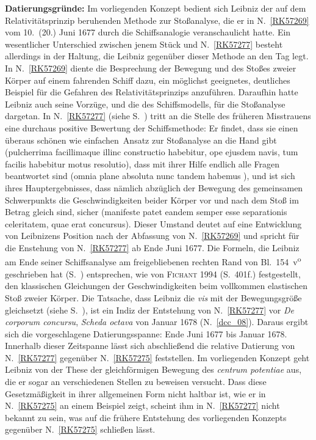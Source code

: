 \begin{ledgroup}
\footnotesize
\pstart
\noindent%
\textbf{Datierungsgründe:} %
Im vorliegenden Konzept bedient sich Leibniz der auf dem Relativitätsprinzip beruhenden Methode zur Stoßanalyse,
%
die er in N.~\ref{RK57269} vom 10.\ (20.) Juni 1677 durch die Schiffsanalogie veranschaulicht hatte.
%
Ein wesentlicher Unterschied zwischen jenem Stück und N.~\ref{RK57277} besteht allerdings in der Haltung,
%
die Leibniz gegenüber dieser Methode an den Tag legt.
%
In N.~\ref{RK57269} diente die Besprechung der Bewegung und des Stoßes zweier Körper auf einem fahrenden Schiff dazu,
%
ein möglichst geeignetes, deutliches Beispiel für die Gefahren des Relativitätsprinzips anzuführen.
%
Daraufhin hatte Leibniz auch seine Vorzüge, und die des Schiffsmodells, für die Stoßanalyse dargetan.
%
In N.~\ref{RK57277} (siehe S.~) 
%
tritt an die Stelle des früheren Misstrauens eine durchaus positive Bewertung der Schiffsmethode:
%
Er findet, dass sie einen \glqq überaus schönen wie einfachen\grqq\ Ansatz zur Stoßanalyse an die Hand gibt
(\glqq pulcherrima facillimaque illinc constructio habebitur, ope ejusdem navis, tum facilis habebitur motus resolutio\grqq),
%
dass mit ihrer Hilfe endlich alle Fragen beantwortet sind (\glqq omnia plane absoluta nunc tandem habemus \grqq),
%
und ist sich ihres Hauptergebnisses, dass nämlich abzüglich der Bewegung des gemeinsamen Schwerpunkts
%
die Geschwindigkeiten beider Körper vor und nach dem Stoß im Betrag gleich sind,
%
sicher (\glqq manifeste patet eandem semper esse separationis celeritatem, quae erat concursus\grqq).
%
%
Dieser Umstand deutet auf eine Entwicklung von Leibnizens Position nach der Abfassung von N.~\ref{RK57269} und spricht für
%
die Enstehung von N.~\ref{RK57277} ab Ende Juni 1677.
%
Die Formeln, die Leibniz am Ende seiner Schiffsanalyse am freigebliebenen rechten Rand von Bl.~154~v\textsuperscript{o} 
geschrieben hat (S.~) entsprechen, wie von \textsc{Fichant} 1994 (S.~401f.) festgestellt, den klassischen Gleichungen der Geschwindigkeiten beim vollkommen elastischen Stoß zweier Körper.
%
\pend
%
\pstart
Die Tatsache, dass Leibniz die \textit{vis} mit der Bewegungsgröße gleichsetzt 
(siehe S.~),
ist ein Indiz der Entstehung von N.~\ref{RK57277} vor \textit{De corporum concursu}, \textit{Scheda octava} von Januar 1678 (N.~\ref{dcc_08}).
Daraus ergibt sich die vorgeschlagene Datierungsspanne: Ende Juni 1677 bis Januar 1678.
\pend
%
\pstart
Innerhalb dieser Zeitspanne lässt sich abschließend die relative Datierung von N.~\ref{RK57277} gegenüber N.~\ref{RK57275} feststellen.
%
Im vorliegenden Konzept geht Leibniz von der These der gleichförmigen Bewegung des \textit{centrum potentiae} aus,
%
die er sogar an verschiedenen Stellen zu beweisen versucht.
%
Dass diese Gesetzmäßigkeit in ihrer allgemeinen Form nicht haltbar ist, wie er in N.~\ref{RK57275} an einem Beispiel zeigt,
%
scheint ihm in N.~\ref{RK57277} nicht bekannt zu sein, was auf die frühere Entstehung
%
des vorliegenden Konzepts gegenüber N.~\ref{RK57275} schließen lässt.
%
\pend 
\end{ledgroup}
